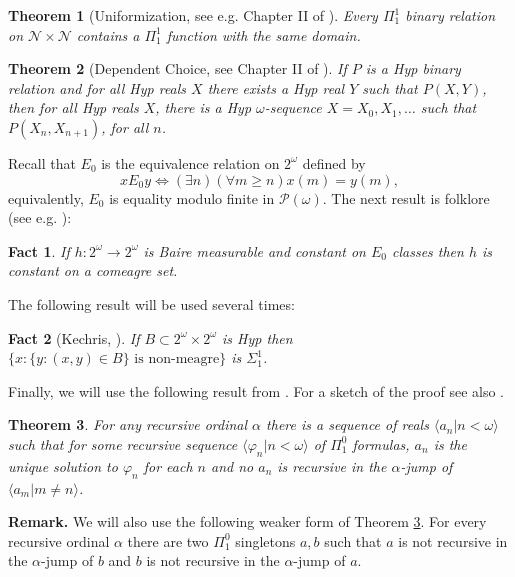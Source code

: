 \documentclass[11pt, english]{article}
\newtheorem{thm}{Theorem}
\newtheorem{fact}{Fact}
\newcommand{\baire}{\mathscr N}
\begin{document}
\begin{thm}[Uniformization, see e.g. Chapter II of \cite{Sacks}]\label{Uni}
 Every $\Pi^1_1$ binary relation on $\baire\times \baire$ contains a $\Pi^1_1$
 function with the same domain.
\end{thm}

\begin{thm}[Dependent Choice, see Chapter II of \cite{Sacks}]\label{DC}
If $P$ is a Hyp binary relation and for all Hyp reals $X$ there
exists a Hyp real $Y$ such that $P(X,Y)$, then for all Hyp reals
$X$, there is a Hyp $\omega$-sequence $X=X_0, X_1,\ldots$ such that
$P(X_n,X_{n+1})$, for all $n$.
\end{thm}

Recall that $E_0$ is the equivalence relation on $2^\omega$
defined by
$$
xE_0 y\iff (\exists n)(\forall m\geq n) x(m)=y(m),
$$
equivalently, $E_0$ is equality modulo finite in $\mathcal
P(\omega)$. The next result is folklore (see e.g. \cite[Theorem
3.2]{hjorth}):

\begin{fact}\label{fct1} If $h: 2^\omega\to 2^\omega$ is Baire measurable and constant on $E_0$
classes then $h$ is constant on a comeagre set.
\end{fact}

The following result will be used several times:

\begin{fact}[Kechris, \cite{kechris73}]\label{fct2} If $B\subset 2^\omega\times 2^\omega$ is Hyp then $\{x: \{y: (x,y)\in
B\} \text{ is non-meagre}\}$ is $\Sigma^1_1$.
\end{fact}

Finally, we will use the following result from \cite{Harrington}.
For a sketch of the proof see also \cite{hjohar}.

\begin{thm}\label{Har}
For any recursive ordinal $\alpha$ there is a sequence of reals
$\langle a_n | n < \omega\rangle$ such that for some recursive
sequence $\langle\varphi_n | n < \omega\rangle$ of $\Pi^0_1$
formulas, $a_n$ is the unique solution to $\varphi_n$ for each $n$
and no $a_n$ is recursive in the $\alpha$-jump of $\langle a_m | m
\neq n\rangle$.
\end{thm}

\noindent \textbf{Remark.} We will also use the following weaker
form of Theorem \ref{Har}. For every recursive ordinal $\alpha$
there are two $\Pi^0_1$ singletons $a, b$ such that $a$ is not
recursive in the $\alpha$-jump of $b$ and $b$ is not recursive in
the $\alpha$-jump of $a$.
\end{document}
